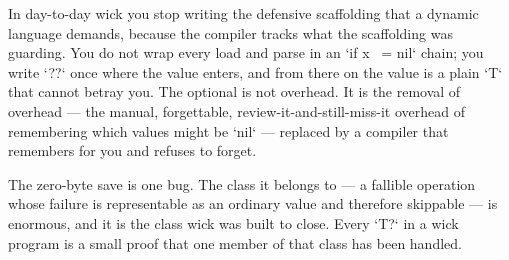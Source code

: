 In day-to-day wick you stop writing the defensive scaffolding that a dynamic
language demands, because the compiler tracks what the scaffolding was
guarding. You do not wrap every load and parse in an `if x ~= nil` chain; you
write `??` once where the value enters, and from there on the value is a plain
`T` that cannot betray you. The optional is not overhead. It is the removal of
overhead --- the manual, forgettable, review-it-and-still-miss-it overhead of
remembering which values might be `nil` --- replaced by a compiler that
remembers for you and refuses to forget.

The zero-byte save is one bug. The class it belongs to --- a fallible operation
whose failure is representable as an ordinary value and therefore skippable ---
is enormous, and it is the class wick was built to close. Every `T?` in a wick
program is a small proof that one member of that class has been handled.
